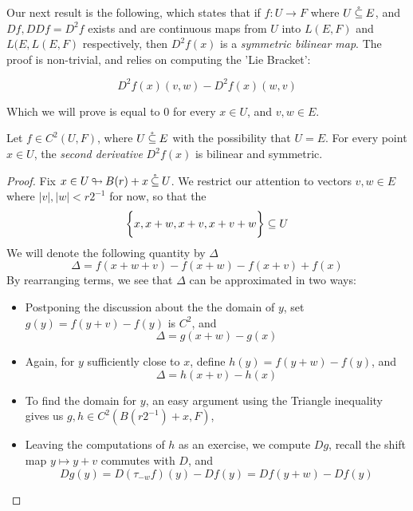 \documentclass[../main-v2-manifolds.tex]{subfiles}
\begin{document}
Our next result is the following, which states that if $f: U\to F$ where $U\:\mathring{\subseteq}\: E$, and $Df, DDf = D^2f$ exists and are continuous maps from $U$ into $L(E,F)$ and $L(E,L(E,F)$ respectively, then $D^2f(x)$ is a \emph{symmetric bilinear map}. The proof is non-trivial, and relies on computing the 'Lie Bracket':

\[
    D^2f(x)(v,w) - D^2f(x)(w,v)
\]

Which we will prove is equal to $0$ for every $x\in U$, and $v,w\in E$.

\begin{wts}
    Let $f\in C^2(U, F)$, where $U\:\mathring{\subseteq}\: E$ with the possibility that $U = E$. For every point $x\in U$, the \emph{second derivative} $D^2f(x)$ is bilinear and symmetric.
\end{wts}
\begin{proof}
    Fix $x\in U{\:\looparrowright\:} B(r) + x\:\mathring{\subseteq}\: U$. We restrict our attention to vectors $v,w\in E$ where $\vert v\vert, \vert w\vert < r2^{-1}$ for now, so that the
    \[
    \biggl\{{x, x+w, x+v, x+v+w}\biggr\}\subseteq U
    \]
    We will denote the following quantity by $\Delta$
    \[
        \Delta = f(x+w+v) - f(x+w) - f(x+v) + f(x)
    \]
    By rearranging terms, we see that $\Delta$ can be approximated in two ways:
    \begin{itemize}
        \item Postponing the discussion about the the domain of $y$, set $g(y) = f(y+v) - f(y)$ is $C^2$, and 
        \begin{equation}\label{second-derivative-Delta-g}
            \Delta = g(x+w) - g(x)
        \end{equation}
        \item Again, for $y$ sufficiently close to $x$, define $h(y) = f(y+w) - f(y)$, and
        \begin{equation}\label{second-derivative-Delta-h}
            \Delta = h(x+v) - h(x)
        \end{equation}
        \item To find the domain for $y$, an easy argument using the Triangle inequality gives us $g,h \in C^2(B(r2^{-1}) + x, F)$,
        \item Leaving the computations of $h$ as an exercise, we compute $Dg$, recall the shift map $y\mapsto y+v$ commutes with $D$, and
        \begin{equation}\label{second-derivative-Delta-Dg}
            Dg(y) = D(\tau_{-w}f)(y)  - Df(y) = Df(y+w) - Df(y)
        \end{equation}
    \end{itemize}


\end{proof}
\end{document}
